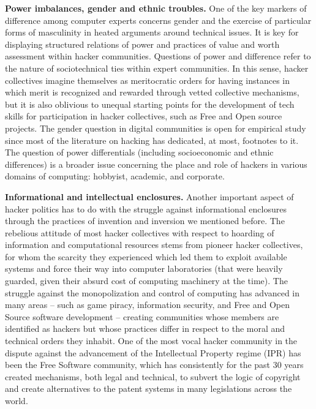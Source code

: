 \documentclass[10pt,letter,oneside]{scrartcl}
\begin{document}
{\bf Power imbalances, gender and ethnic troubles.} One of the key markers of
difference among computer experts concerns gender and the exercise of particular
forms of masculinity in heated arguments around technical issues. It is key for
displaying structured relations of power and practices of value and worth
assessment within hacker communities.  Questions of power and difference refer 
to the nature of sociotechnical ties within expert communities. In this sense,
hacker collectives imagine themselves as meritocratic orders for having
instances in which merit is recognized and rewarded through vetted collective
mechanisms, but it is also oblivious to unequal starting points for the
development of tech skills for participation in hacker collectives, such as Free
and Open source projects. The gender question in digital communities is open for
empirical study since most of the literature on hacking has dedicated, at most,
footnotes to it. The question of power differentials (including socioeconomic and
ethnic differences) is a broader issue concerning the place and role of hackers
in various domains of computing: hobbyist, academic, and corporate.



{\bf Informational and intellectual enclosures.} Another important aspect of
hacker politics has to do with the struggle against informational enclosures
through the practices of invention and inversion we mentioned before. The 
rebelious attitude of most hacker collectives with respect to hoarding of
information and computational resources stems from pioneer hacker collectives,
for whom the scarcity they experienced which led them to exploit available 
systems and force their way into computer laboratories (that were heavily 
guarded, given their absurd cost of computing machinery at the time). The 
struggle against the monopolization and control of computing has advanced 
in many areas -- such as game piracy, information security, and Free and 
Open Source software development -- creating communities whose members are 
identified as hackers but whose practices differ in respect to the moral and 
technical orders they inhabit. One of the most vocal hacker community in the 
dispute against the advancement of the Intellectual Property regime (IPR) has
been the Free Software community, which has consistently for the past 30 
years created mechanisms, both legal and technical, to subvert the
logic of copyright and create alternatives to the patent systems in many
legislations across the world.
\end{document}
